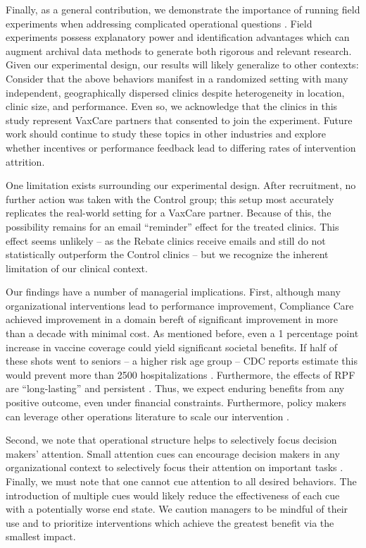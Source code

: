 \begin{onehalfspace}
 Finally, as a general contribution, we demonstrate the importance of running field experiments when addressing complicated operational questions \citep{Ibanez2019a}. Field experiments possess explanatory power and identification advantages which can augment archival data methods to generate both rigorous and relevant research. Given our experimental design, our results will likely generalize to other contexts: Consider that the above behaviors manifest in a randomized setting with many independent, geographically dispersed clinics despite heterogeneity in location, clinic size, and performance. Even so, we acknowledge that the clinics in this study represent VaxCare partners that consented to join the experiment. Future work should continue to study these topics in other industries and explore whether incentives or performance feedback lead to differing rates of intervention attrition.
 
 One limitation exists surrounding our experimental design. After recruitment, no further action was taken with the Control group; this setup most accurately replicates the real-world setting for a VaxCare partner. Because of this, the possibility remains for an email “reminder” effect for the treated clinics. This effect seems unlikely – as the Rebate clinics receive emails and still do not statistically outperform the Control clinics – but we recognize the inherent limitation of our clinical context. 
 
 Our findings have a number of managerial implications. First, although many organizational interventions lead to performance improvement, Compliance Care achieved improvement in a domain bereft of significant improvement in more than a decade with minimal cost. As mentioned before, even a 1 percentage point increase in vaccine coverage could yield significant societal benefits. If half of these shots went to seniors – a higher risk age group – CDC reports estimate this would prevent more than 2500 hospitalizations \citep{Rolfes2019}. Furthermore, the effects of RPF are “long-lasting” \citep{Blanes-i-Vidal2011} and persistent \citep{Delfgaauw2013}. Thus, we expect enduring benefits from any positive outcome, even under financial constraints. Furthermore, policy makers can leverage other operations literature to scale our intervention \citep{Drakopoulos2017, Gupta2020}.
 
 Second, we note that operational structure helps to selectively focus decision makers’ attention. Small attention cues can encourage decision makers in any organizational context to selectively focus their attention on important tasks \citep[e.g.,][]{Song2018a,Kim2020}. Finally, we must note that one cannot cue attention to all desired behaviors. The introduction of multiple cues would likely reduce the effectiveness of each cue with a potentially worse end state. We caution managers to be mindful of their use and to prioritize interventions which achieve the greatest benefit via the smallest impact.
 

\end{onehalfspace}
